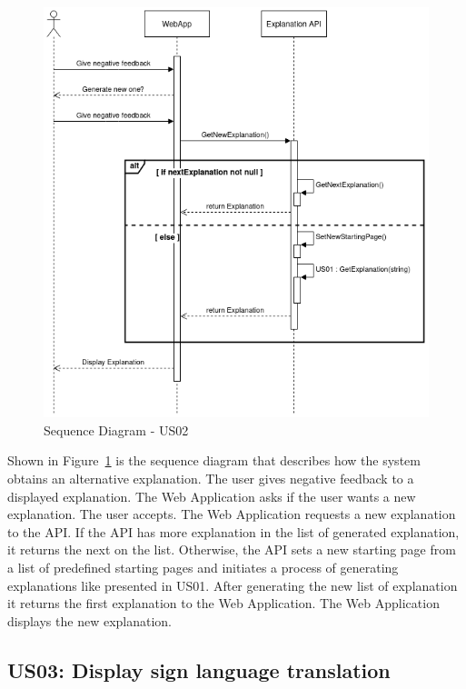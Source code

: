 \begin{figure}[H]
\centering
\includegraphics[scale=0.45]{ch4/assets/US02_SD.png}
\caption[Sequence Diagram US02]{Sequence Diagram - US02}
\label{fig:sdus02}
\end{figure}

Shown in Figure~\ref{fig:sdus02} is the sequence diagram that describes how the system obtains an alternative explanation.
The user gives negative feedback to a displayed explanation.
The Web Application asks if the user wants a new explanation.
The user accepts.
The Web Application requests a new explanation to the API.
If the API has more explanation in the list of generated explanation, it returns the next on the list.
Otherwise, the API sets a new starting page from a list of predefined starting pages and initiates a process of generating explanations like presented in US01.
After generating the new list of explanation it returns the first explanation to the Web Application.
The Web Application displays the new explanation.

\subsection{US03: Display sign language translation}

